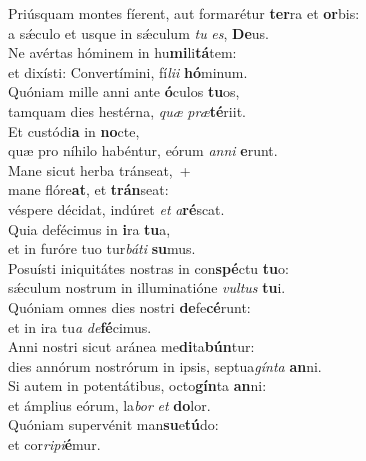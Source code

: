 \evenverse Priúsquam montes fíerent, aut formarétur \textbf{ter}ra et \textbf{or}bis:~\*\\
\evenverse a sǽculo et usque in sǽculum \textit{tu} \textit{es}, \textbf{De}us.\\
\oddverse Ne avértas hóminem in hu\textbf{mi}li\textbf{tá}tem:~\*\\
\oddverse et dixísti: Convertímini, fí\textit{li}\textit{i} \textbf{hó}minum.\\
\evenverse Quóniam mille anni ante \textbf{ó}culos \textbf{tu}os,~\*\\
\evenverse tamquam dies hestérna, \textit{quæ} \textit{præ}\textbf{té}riit.\\
\oddverse Et custódi\textbf{a} in \textbf{no}cte,~\*\\
\oddverse quæ pro níhilo habéntur, eórum \textit{an}\textit{ni} \textbf{e}runt.\\
\evenverse Mane sicut herba tránseat,~+\\
\evenverse  mane flóre\textbf{at}, et \textbf{trán}seat:~\*\\
\evenverse véspere décidat, indúret \textit{et} \textit{a}\textbf{ré}scat.\\
\oddverse Quia defécimus in \textbf{i}ra \textbf{tu}a,~\*\\
\oddverse et in furóre tuo tur\textit{bá}\textit{ti} \textbf{su}mus.\\
\evenverse Posuísti iniquitátes nostras in con\textbf{spé}ctu \textbf{tu}o:~\*\\
\evenverse sǽculum nostrum in illuminatióne \textit{vul}\textit{tus} \textbf{tu}i.\\
\oddverse Quóniam omnes dies nostri \textbf{de}fe\textbf{cé}runt:~\*\\
\oddverse et in ira tu\textit{a} \textit{de}\textbf{fé}cimus.\\
\evenverse Anni nostri sicut aránea me\textbf{di}ta\textbf{bún}tur:~\*\\
\evenverse dies annórum nostrórum in ipsis, septua\textit{gín}\textit{ta} \textbf{an}ni.\\
\oddverse Si autem in potentátibus, octo\textbf{gín}ta \textbf{an}ni:~\*\\
\oddverse et ámplius eórum, la\textit{bor} \textit{et} \textbf{do}lor.\\
\evenverse Quóniam supervénit man\textbf{su}e\textbf{tú}do:~\*\\
\evenverse et cor\textit{ri}\textit{pi}\textbf{é}mur.\\
